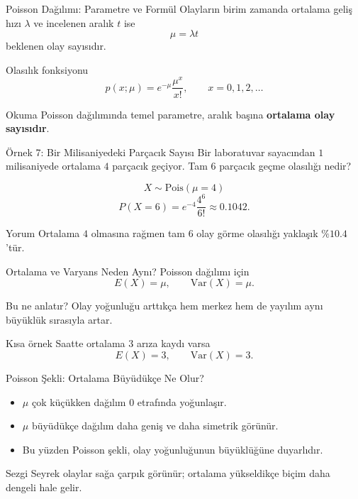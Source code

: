 \documentclass[light]{lutbeamer}
\begin{document}
\begin{frame}{Poisson Dağılımı: Parametre ve Formül}
    \small
    Olayların birim zamanda ortalama geliş hızı \(\lambda\) ve incelenen aralık \(t\) ise
    \[
    \mu=\lambda t
    \]
    beklenen olay sayısıdır.

    \begin{block}{Olasılık fonksiyonu}
        \[
        p(x;\mu)=e^{-\mu}\frac{\mu^x}{x!},
        \qquad x=0,1,2,\dots
        \]
    \end{block}

    \begin{alertblock}{Okuma}
        Poisson dağılımında temel parametre, aralık başına \textbf{ortalama olay sayısıdır}.
    \end{alertblock}
\end{frame}

\begin{frame}{Örnek 7: Bir Milisaniyedeki Parçacık Sayısı}
    \small
    Bir laboratuvar sayacından \(1\) milisaniyede ortalama \(4\) parçacık geçiyor. Tam \(6\) parçacık geçme olasılığı nedir?

    \[
    X \sim \text{Pois}(\mu=4)
    \]
    \[
    P(X=6)=e^{-4}\frac{4^6}{6!}\approx 0.1042.
    \]

    \begin{exampleblock}{Yorum}
        Ortalama \(4\) olmasına rağmen tam \(6\) olay görme olasılığı yaklaşık \(\%10.4\)'tür.
    \end{exampleblock}
\end{frame}

\begin{frame}{Ortalama ve Varyans Neden Aynı?}
    \small
    Poisson dağılımı için
    \[
    E(X)=\mu, \qquad \mathrm{Var}(X)=\mu.
    \]

    \begin{block}{Bu ne anlatır?}
        Olay yoğunluğu arttıkça hem merkez hem de yayılım aynı büyüklük sırasıyla artar.
    \end{block}

    \begin{exampleblock}{Kısa örnek}
        Saatte ortalama \(3\) arıza kaydı varsa
        \[
        E(X)=3, \qquad \mathrm{Var}(X)=3.
        \]
    \end{exampleblock}
\end{frame}

\begin{frame}{Poisson Şekli: Ortalama Büyüdükçe Ne Olur?}
    \small
    \begin{itemize}
        \item \(\mu\) çok küçükken dağılım \(0\) etrafında yoğunlaşır.
        \item \(\mu\) büyüdükçe dağılım daha geniş ve daha simetrik görünür.
        \item Bu yüzden Poisson şekli, olay yoğunluğunun büyüklüğüne duyarlıdır.
    \end{itemize}

    \begin{alertblock}{Sezgi}
        Seyrek olaylar sağa çarpık görünür; ortalama yükseldikçe biçim daha dengeli hale gelir.
    \end{alertblock}
\end{frame}
\end{document}
